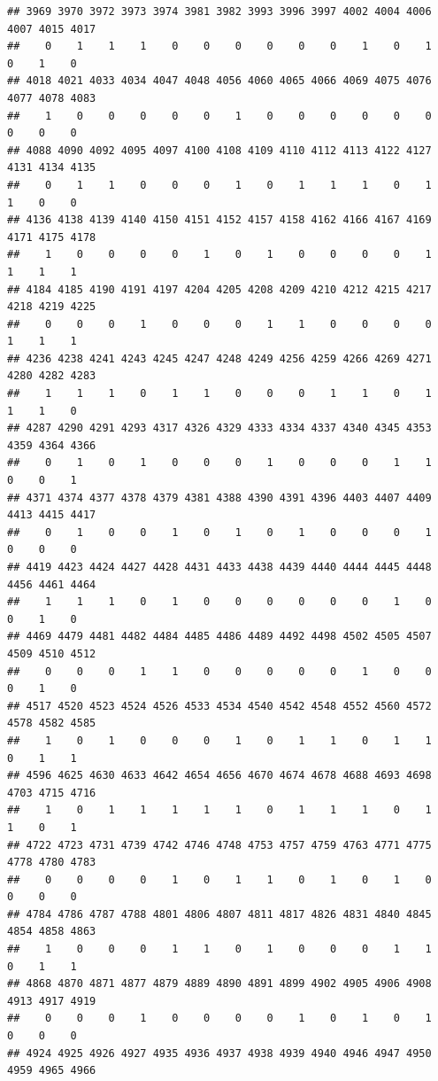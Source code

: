 \documentclass[
]{article}
\begin{document}
\begin{verbatim}
## 3969 3970 3972 3973 3974 3981 3982 3993 3996 3997 4002 4004 4006 4007 4015 4017 
##    0    1    1    1    0    0    0    0    0    0    1    0    1    0    1    0 
## 4018 4021 4033 4034 4047 4048 4056 4060 4065 4066 4069 4075 4076 4077 4078 4083 
##    1    0    0    0    0    0    1    0    0    0    0    0    0    0    0    0 
## 4088 4090 4092 4095 4097 4100 4108 4109 4110 4112 4113 4122 4127 4131 4134 4135 
##    0    1    1    0    0    0    1    0    1    1    1    0    1    1    0    0 
## 4136 4138 4139 4140 4150 4151 4152 4157 4158 4162 4166 4167 4169 4171 4175 4178 
##    1    0    0    0    0    1    0    1    0    0    0    0    1    1    1    1 
## 4184 4185 4190 4191 4197 4204 4205 4208 4209 4210 4212 4215 4217 4218 4219 4225 
##    0    0    0    1    0    0    0    1    1    0    0    0    0    1    1    1 
## 4236 4238 4241 4243 4245 4247 4248 4249 4256 4259 4266 4269 4271 4280 4282 4283 
##    1    1    1    0    1    1    0    0    0    1    1    0    1    1    1    0 
## 4287 4290 4291 4293 4317 4326 4329 4333 4334 4337 4340 4345 4353 4359 4364 4366 
##    0    1    0    1    0    0    0    1    0    0    0    1    1    0    0    1 
## 4371 4374 4377 4378 4379 4381 4388 4390 4391 4396 4403 4407 4409 4413 4415 4417 
##    0    1    0    0    1    0    1    0    1    0    0    0    1    0    0    0 
## 4419 4423 4424 4427 4428 4431 4433 4438 4439 4440 4444 4445 4448 4456 4461 4464 
##    1    1    1    0    1    0    0    0    0    0    0    1    0    0    1    0 
## 4469 4479 4481 4482 4484 4485 4486 4489 4492 4498 4502 4505 4507 4509 4510 4512 
##    0    0    0    1    1    0    0    0    0    0    1    0    0    0    1    0 
## 4517 4520 4523 4524 4526 4533 4534 4540 4542 4548 4552 4560 4572 4578 4582 4585 
##    1    0    1    0    0    0    1    0    1    1    0    1    1    0    1    1 
## 4596 4625 4630 4633 4642 4654 4656 4670 4674 4678 4688 4693 4698 4703 4715 4716 
##    1    0    1    1    1    1    1    0    1    1    1    0    1    1    0    1 
## 4722 4723 4731 4739 4742 4746 4748 4753 4757 4759 4763 4771 4775 4778 4780 4783 
##    0    0    0    0    1    0    1    1    0    1    0    1    0    0    0    0 
## 4784 4786 4787 4788 4801 4806 4807 4811 4817 4826 4831 4840 4845 4854 4858 4863 
##    1    0    0    0    1    1    0    1    0    0    0    1    1    0    1    1 
## 4868 4870 4871 4877 4879 4889 4890 4891 4899 4902 4905 4906 4908 4913 4917 4919 
##    0    0    0    1    0    0    0    0    1    0    1    0    1    0    0    0 
## 4924 4925 4926 4927 4935 4936 4937 4938 4939 4940 4946 4947 4950 4959 4965 4966 

\end{verbatim}
\end{document}
